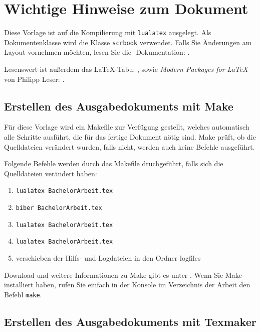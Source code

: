 \chapter{Wichtige Hinweise zum Dokument}\label{make}

Diese Vorlage ist auf die Kompilierung mit \texttt{lualatex} ausgelegt. 
Als Dokumentenklasse  wird die \KOMAScript\-Klasse \texttt{scrbook} verwendet.
Falls Sie Änderungen am Layout vornehmen möchten, lesen Sie die \KOMAScript-Dokumentation: \cite{koma}.

Lesenswert ist außerdem das \LaTeX-Tabu: \cite{l2tabu}, sowie \emph{Modern Packages for \LaTeX} von Philipp Leser: \cite{pleser}.

\section{Erstellen des Ausgabedokuments mit Make}

Für diese Vorlage wird ein Makefile zur Verfügung gestellt, welches automatisch alle Schritte ausführt, die für das fertige Dokument nötig sind. Make prüft, ob die Quelldateien verändert wurden, falls nicht, werden auch keine Befehle ausgeführt.

Folgende Befehle werden durch das Makefile druchgeführt, falls sich die Quelldateien verändert haben:

\begin{enumerate}
    \item \texttt{lualatex BachelorArbeit.tex}
    \item \texttt{biber BachelorArbeit.tex}
    \item \texttt{lualatex BachelorArbeit.tex}
    \item \texttt{lualatex BachelorArbeit.tex}
    \item verschieben der Hilfs- und Logdateien in den Ordner logfiles
\end{enumerate}


Download und weitere Informationen zu Make gibt es unter \cite{make}.
Wenn Sie Make installiert haben, rufen Sie einfach in der Konsole im Verzeichnis der Arbeit den Befehl \texttt{make}.

\section{Erstellen des Ausgabedokuments mit Texmaker}

